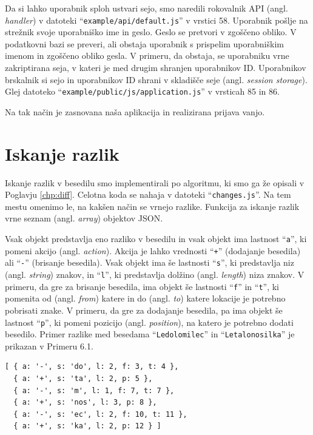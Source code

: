 \documentclass[a4paper, 12pt, twoside]{book}
\begin{document}
Da si lahko uporabnik sploh ustvari sejo, smo naredili rokovalnik API (angl. \textit{handler}) v datoteki “{\tt example/api/default.js}” v vrstici 58. Uporabnik pošlje na strežnik svoje uporabniško ime in geslo. Geslo se pretvori v zgoščeno obliko. V podatkovni bazi se preveri, ali obstaja uporabnik s prispelim uporabniškim imenom in zgoščeno obliko gesla. V primeru, da obstaja, se uporabniku vrne zakriptirana seja, v kateri je med drugim shranjen uporabnikov ID. Uporabnikov brskalnik si sejo in uporabnikov ID shrani v skladišče seje (angl. \textit{session storage}). Glej datoteko “{\tt example/public/js/application.js}” v vrsticah 85 in 86.

Na tak način je zasnovana naša aplikacija in realizirana prijava vanjo.

\section{Iskanje razlik}

Iskanje razlik v besedilu smo implementirali po algoritmu, ki smo ga že opisali v Poglavju \ref{chp:diff}. Celotna koda se nahaja v datoteki “{\tt changes.js}”. Na tem mestu omenimo le, na kakšen način se vrnejo razlike. Funkcija za iskanje razlik vrne seznam (angl. \textit{array}) objektov JSON.

Vsak objekt predstavlja eno razliko v besedilu in vsak objekt ima lastnost “{\tt a}”, ki pomeni akcijo (angl. \textit{action}). Akcija je lahko vrednosti “{\tt +}” (dodajanje besedila) ali “{\tt -}” (brisanje besedila). Vsak objekt ima še lastnosti “{\tt s}”, ki predstavlja niz (angl. \textit{string}) znakov, in “{\tt l}”, ki predstavlja dolžino (angl. \textit{length}) niza znakov. V primeru, da gre za brisanje besedila, ima objekt še lastnosti “{\tt f}” in “{\tt t}”, ki pomenita od (angl. \textit{from}) katere in do (angl. \textit{to}) katere lokacije je potrebno pobrisati znake. V primeru, da gre za dodajanje besedila, pa ima objekt še lastnost “{\tt p}”, ki pomeni pozicijo (angl. \textit{position}), na katero je potrebno dodati besedilo. Primer razlike med besedama “{\tt Ledolomilec}” in “{\tt Letalonosilka}” je prikazan v Primeru 6.1.\newline

\begin{lstlisting}[title={Primer 6.1: Razlike med besedama “{\tt Ledolomilec}” in “{\tt Letalonosilka}”.}]
[ { a: '-', s: 'do', l: 2, f: 3, t: 4 },
  { a: '+', s: 'ta', l: 2, p: 5 },
  { a: '-', s: 'm', l: 1, f: 7, t: 7 },
  { a: '+', s: 'nos', l: 3, p: 8 },
  { a: '-', s: 'ec', l: 2, f: 10, t: 11 },
  { a: '+', s: 'ka', l: 2, p: 12 } ]
\end{lstlisting}
\end{document}
